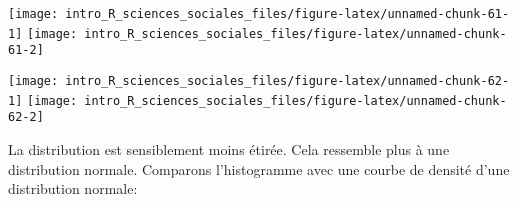\documentclass[
]{book}
\newenvironment{Shaded}{\begin{snugshade}}{\end{snugshade}}
\newcommand{\AttributeTok}[1]{\textcolor[rgb]{0.77,0.63,0.00}{#1}}
\newcommand{\CommentTok}[1]{\textcolor[rgb]{0.56,0.35,0.01}{\textit{#1}}}
\newcommand{\FunctionTok}[1]{\textcolor[rgb]{0.00,0.00,0.00}{#1}}
\newcommand{\NormalTok}[1]{#1}
\newcommand{\SpecialCharTok}[1]{\textcolor[rgb]{0.00,0.00,0.00}{#1}}
\newcommand{\StringTok}[1]{\textcolor[rgb]{0.31,0.60,0.02}{#1}}
\begin{document}
\texttt{[image: intro\_R\_sciences\_sociales\_files/figure-latex/unnamed-chunk-61-1]} \texttt{[image: intro\_R\_sciences\_sociales\_files/figure-latex/unnamed-chunk-61-2]}

\begin{Shaded}
\end{Shaded}

\texttt{[image: intro\_R\_sciences\_sociales\_files/figure-latex/unnamed-chunk-62-1]} \texttt{[image: intro\_R\_sciences\_sociales\_files/figure-latex/unnamed-chunk-62-2]}

La distribution est sensiblement moins étirée. Cela ressemble plus à une distribution normale. Comparons l'histogramme avec une courbe de densité d'une distribution normale:
\end{document}
